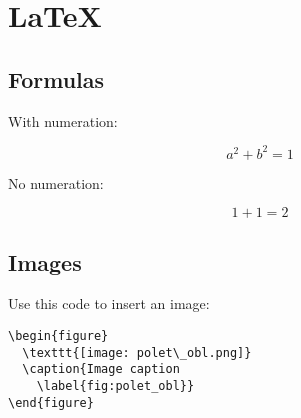 \documentclass[a4paper, oneside, openany, 14pt]{article}
\begin{document}
\section{\LaTeX}
\subsection{Formulas}

With numeration:

\begin{equation}
  a^2 + b^2 = 1
\end{equation}

No numeration:

\[1+1=2\]

\subsection{Images}

Use this code to insert an image:

\begin{verbatim}
\begin{figure}
  \texttt{[image: polet\_obl.png]}
  \caption{Image caption
    \label{fig:polet_obl}}
\end{figure}
\end{verbatim}
\end{document}
